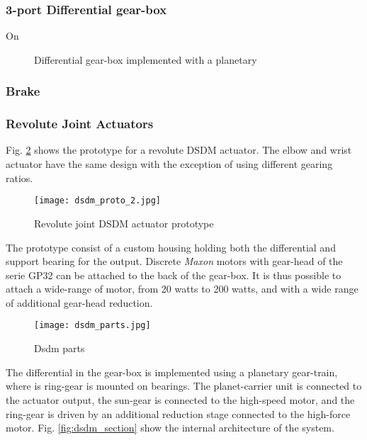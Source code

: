 \subsubsection{3-port Differential gear-box}

On

\begin{figure}[htp]
        \centering
				\hspace{+5pt}
        \caption{Differential gear-box implemented with a planetary}
				\label{fig:differnentials}
\end{figure}


\subsubsection{Brake}


\subsubsection{Revolute Joint Actuators}

Fig. \ref{fig:dsdm_act} shows the prototype for a revolute DSDM actuator. The elbow and wrist actuator have the same design with the exception of using different gearing ratios.

\begin{figure}[htp]
	\centering
		\texttt{[image: dsdm\_proto\_2.jpg]}
	\caption{Revolute joint DSDM actuator prototype } %
	\label{fig:dsdm_act}
\end{figure}

The prototype consist of a custom housing holding both the differential and support bearing for the output. Discrete \textit{Maxon} motors with gear-head of the serie GP32 can be attached to the back of the gear-box. It is thus possible to attach a wide-range of motor, from 20 watts to 200 watts, and with a wide range of additional gear-head reduction. 

\begin{figure}[htbp]
	\centering
		\texttt{[image: dsdm\_parts.jpg]}
	\caption{Dsdm parts}
	\label{fig:dsdm_parts}
\end{figure}


The differential in the gear-box is implemented using a planetary gear-train, where is ring-gear is mounted on bearings. The planet-carrier unit is connected to the actuator output, the sun-gear is connected to the high-speed motor, and the ring-gear is driven by an additional reduction stage connected to the high-force motor. Fig. \ref{fig:dsdm_section} show the internal architecture of the system.


